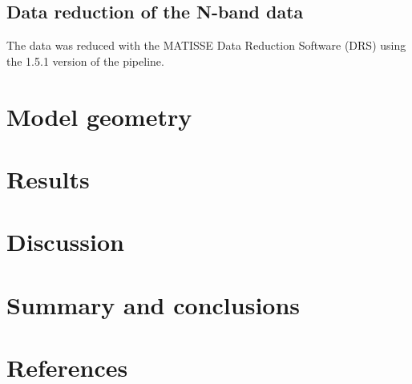 \documentclass{aa}
\begin{document}
\subsection{Data reduction of the N-band data}
The data was reduced with the MATISSE Data Reduction Software (DRS) using the
1.5.1 version of the pipeline.
\section{Model geometry}
\section{Results}
\section{Discussion}
\section{Summary and conclusions}
\section*{References}



\end{document}
